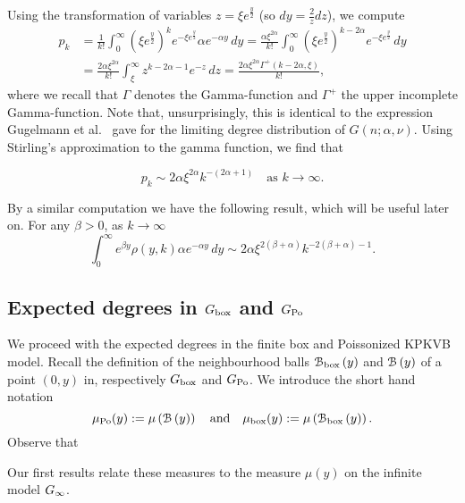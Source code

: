 Using the transformation of variables $z = \xi e^{\frac{y}{2}}$ (so $dy = \frac{2}{z}dz$), we compute
\begin{align*}
	p_k
    &= \frac{1}{k!} \int_0^\infty \left(\xi e^{\frac{y}{2}}\right)^k 
    	e^{-\xi e^{\frac{y}{2}}} \alpha e^{-\alpha y} \, dy
    	= \frac{\alpha \xi^{2\alpha}}{k!} \int_0^\infty 
    	\left(\xi e^{\frac{y}{2}}\right)^{k - 2\alpha} e^{-\xi e^{\frac{y}{2}}}
        \, dy\\
    &= \frac{2\alpha \xi^{2\alpha}}{k!} \int_{\xi}^{\infty} 
    	z^{k -2\alpha-1} e^{-z} \, dz
    	= \frac{2\alpha \xi^{2\alpha}\Gamma^+(k - 2\alpha, \xi)}{k!},
\end{align*}
where we recall that $\Gamma$ denotes the Gamma-function and $\Gamma^{+}$ the upper incomplete Gamma-function.
Note that, unsurprisingly, this is identical to the expression Gugelmann et al.~\cite{gugelmann2012random} gave for the limiting degree distribution of $G(n;\alpha,\nu)$. Using Stirling's approximation to the gamma function, we find that 

\begin{equation}\label{eq:degree_distribution_P_asymptotics}
	p_k \sim 2\alpha\xi^{2\alpha} k^{-(2\alpha + 1)}
	\quad \text{as } k \to \infty.
\end{equation}

By a similar computation we have the following result, which will be useful later on. For any $\beta > 0$, as $k \to \infty$
\begin{equation}\label{eq:general_integral_rho_y_k}
	\int_0^\infty e^{\beta y} \rho(y, k) \alpha e^{-\alpha y} \, dy
    \sim 2\alpha \xi^{2(\beta + \alpha)} k^{-2(\beta + \alpha)-1}.
\end{equation}

\subsection{Expected degrees in $G_{\mathrm{box}}$ and $G_{{\mathrm{Po}}}$}\label{ssec:expected_degrees_GPo}

We proceed with the expected degrees in the finite box and Poissonized KPKVB model. Recall the definition of the neighbourhood balls ${\mathcal B}_{\text{box}}\left(y\right)$ and ${\mathcal B}\left(y\right)$ of a point $(0,y)$ in, respectively $G_{\mathrm{box}}$ and $G_{{\mathrm{Po}}}$. We introduce the short hand notation
\[
	\mu_{{\mathrm{Po}}}(y) := \mu\left({\mathcal B}\left(y\right)\right) \quad \text{and} \quad \mu_{\mathrm{box}}(y) := \mu\left({\mathcal B}_{\text{box}}\left(y\right)\right).
\]
Observe that


Our first results relate these measures to the measure $\mu(y)$ on the infinite model $G_{\infty}$.

